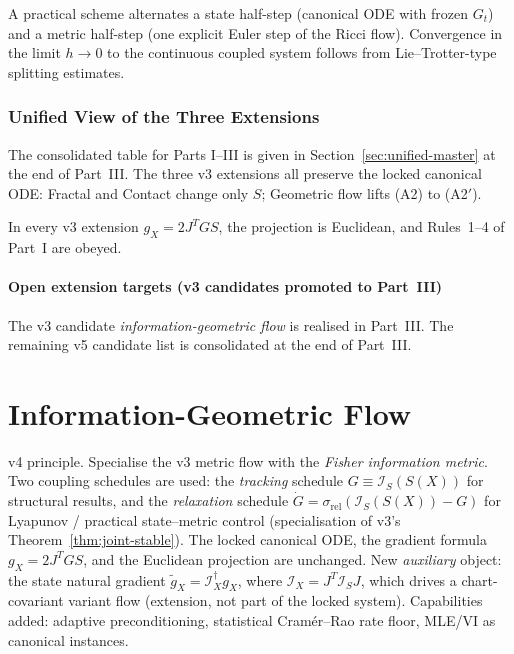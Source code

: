 \documentclass[11pt,oneside]{amsart}
\def\textbf#1{#1}%
\theoremstyle{plain}
\theoremstyle{definition}
\newcommand{\gX}{g_X}
\begin{document}
A practical scheme alternates a state half-step (canonical ODE with
frozen $G_{t}$) and a metric half-step (one explicit Euler step of the
Ricci flow). Convergence in the limit $h\to 0$ to the continuous
coupled system follows from Lie--Trotter-type splitting estimates.

\section{Unified View of the Three Extensions}
\label{sec:unified}

The consolidated table for Parts I--III is given in
Section~\ref{sec:unified-master} at the end of Part~III. The three
v3 extensions all preserve the locked canonical ODE: Fractal and
Contact change only $S$; Geometric flow lifts (A2) to (A2$'$).

\begin{lockbox}
In every v3 extension $\gX = 2 J^{T}G S$, the projection is Euclidean,
and Rules~1--4 of Part~I are obeyed.
\end{lockbox}

\subsection*{Open extension targets (v3 candidates promoted to Part~III)}
The v3 candidate \emph{information-geometric flow} is realised in
Part~III. The remaining v5 candidate list is consolidated at the end
of Part~III.


\part{Information-Geometric Flow}

\begin{lockbox}
\textbf{v4 principle.} Specialise the v3 metric flow with the
\emph{Fisher information metric}. Two coupling schedules are used:
the \emph{tracking} schedule $G\equiv\mathcal{I}_{S}(S(X))$ for structural
results, and the \emph{relaxation} schedule
$\dot G = \sigma_{\mathrm{rel}}(\mathcal{I}_{S}(S(X))-G)$ for Lyapunov / practical
state--metric control (specialisation of v3's Theorem~\ref{thm:joint-stable}). The locked
canonical ODE, the gradient formula $\gX = 2 J^{T}G S$, and the
Euclidean projection are unchanged. New \emph{auxiliary} object: the
state natural gradient $\widetilde\gX = \mathcal{I}_{X}^{\dagger}\gX$,
where $\mathcal{I}_{X}=J^{T}\mathcal{I}_{S}J$, which drives
a chart-covariant variant flow (extension, not part of the locked
system). Capabilities added: adaptive preconditioning, statistical
Cram\'er--Rao rate floor, MLE/VI as canonical instances.
\end{lockbox}
\end{document}
